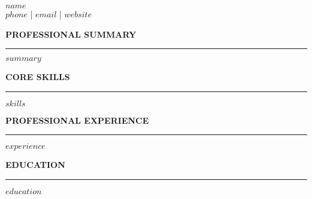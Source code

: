 \documentclass[11pt,a4paper]{article}
\begin{document}
\pagestyle{empty}

\begin{center}
{\LARGE\textbf{$name$}}\\[0.5em]
$phone$ | $email$ | $website$\\[1em]
\end{center}

\textbf{\large PROFESSIONAL SUMMARY}\\[0.3em]
\hrule
\vspace{0.5em}
$summary$

\vspace{1em}
\textbf{\large CORE SKILLS}\\[0.3em]
\hrule
\vspace{0.5em}
$skills$

\vspace{1em}
\textbf{\large PROFESSIONAL EXPERIENCE}\\[0.3em]
\hrule
\vspace{0.5em}
$experience$

\vspace{1em}
\textbf{\large EDUCATION}\\[0.3em]
\hrule
\vspace{0.5em}
$education$
\end{document}
